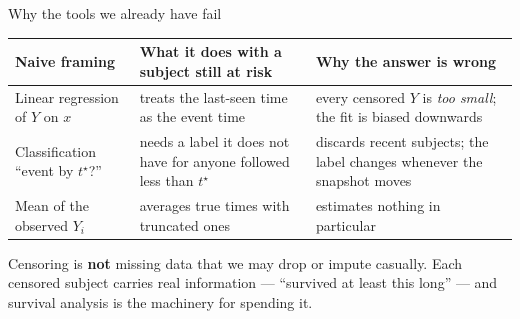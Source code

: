 \documentclass[aspectratio=169,11pt]{beamer}
\begin{document}
\begin{frame}{Why the tools we already have fail}
  \begin{center}\footnotesize
  \begin{tabular}{@{}p{3.5cm}p{4.1cm}p{4.7cm}@{}}
    \toprule
    \textbf{Naive framing} & \textbf{What it does with a subject still at risk} &
    \textbf{Why the answer is wrong} \\
    \midrule
    Linear regression of $Y$ on $x$ & treats the last-seen time as the event time &
    every censored $Y$ is \emph{too small}; the fit is biased downwards \\
    Classification ``event by $t^\star$?'' & needs a label it does not have for
    anyone followed less than $t^\star$ & discards recent subjects; the label
    changes whenever the snapshot moves \\
    Mean of the observed $Y_i$ & averages true times with truncated ones &
    estimates nothing in particular \\
    \bottomrule
  \end{tabular}
  \end{center}
  \begin{takeaway}
    Censoring is \textbf{not} missing data that we may drop or impute casually.
    Each censored subject carries real information --- ``survived at least this
    long'' --- and survival analysis is the machinery for spending it.
  \end{takeaway}
\end{frame}
\end{document}
